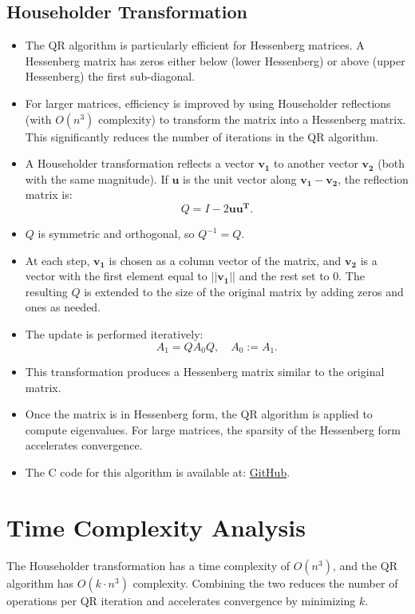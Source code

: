 \documentclass[12pt,letterpaper,onecolumn]{exam}
\begin{document}
\subsection{Householder Transformation}
\begin{itemize}
    \item The QR algorithm is particularly efficient for Hessenberg matrices. A Hessenberg matrix has zeros either below (lower Hessenberg) or above (upper Hessenberg) the first sub-diagonal.
    \item For larger matrices, efficiency is improved by using Householder reflections (with $O(n^3)$ complexity) to transform the matrix into a Hessenberg matrix. This significantly reduces the number of iterations in the QR algorithm.
    \item A Householder transformation reflects a vector $\mathbf{v_1}$ to another vector $\mathbf{v_2}$ (both with the same magnitude). If $\mathbf{u}$ is the unit vector along $\mathbf{v_1} - \mathbf{v_2}$, the reflection matrix is:
    \[
    Q = I - 2\mathbf{uu^{T}}.
    \]
    \item $Q$ is symmetric and orthogonal, so $Q^{-1} = Q$.
    \item At each step, $\mathbf{v_1}$ is chosen as a column vector of the matrix, and $\mathbf{v_2}$ is a vector with the first element equal to $||\mathbf{v_1}||$ and the rest set to 0. The resulting $Q$ is extended to the size of the original matrix by adding zeros and ones as needed.
    \item The update is performed iteratively:
    \[
    A_1 = Q A_0 Q, \quad A_0 := A_1.
    \]
    \item This transformation produces a Hessenberg matrix similar to the original matrix.
    \item Once the matrix is in Hessenberg form, the QR algorithm is applied to compute eigenvalues. For large matrices, the sparsity of the Hessenberg form accelerates convergence.
    \item The C code for this algorithm is available at:
    \href{https://github.com/Pratheek39/EE1030/blob/120977af296ad194235d07bdbaafdb19f6b0e856/QR/main.c}{GitHub}.
\end{itemize}

\section{Time Complexity Analysis}
The Householder transformation has a time complexity of $O(n^3)$, and the QR algorithm has $O(k \cdot n^3)$ complexity. Combining the two reduces the number of operations per QR iteration and accelerates convergence by minimizing $k$.
\end{document}
